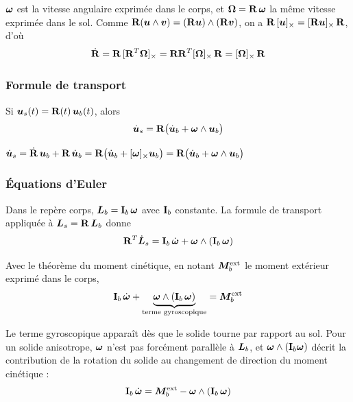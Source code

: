 $\bm{\omega}$ est la vitesse angulaire exprimée dans le corps, et
$\bm{\Omega} = \mathbf{R}\,\bm{\omega}$ la même vitesse exprimée dans
le sol. Comme $\mathbf{R}(\bm{u}\wedge\bm{v})
= (\mathbf{R}\bm{u})\wedge(\mathbf{R}\bm{v})$, on a
$\mathbf{R}\,[\bm{u}]_{\times} = [\mathbf{R}\bm{u}]_{\times}\,\mathbf{R}$, d'où
\[
    \dot{\mathbf{R}} = \mathbf{R}\,[\mathbf{R}^T\bm{\Omega}]_{\times}
    = \mathbf{R}\mathbf{R}^T[\bm{\Omega}]_{\times}\,\mathbf{R}
    = [\bm{\Omega}]_{\times}\,\mathbf{R}
\]

\subsubsection{Formule de transport}

\begin{theoreme}
    Si $\bm{u}_s(t) = \mathbf{R}(t)\,\bm{u}_b(t)$, alors
    \[
        \dot{\bm{u}}_s
        = \mathbf{R}\bigl(\dot{\bm{u}}_b + \bm{\omega}\wedge\bm{u}_b\bigr)
    \]
\end{theoreme}

\begin{preuve}
    $\dot{\bm{u}}_s = \dot{\mathbf{R}}\,\bm{u}_b
    + \mathbf{R}\,\dot{\bm{u}}_b
    = \mathbf{R}\bigl(\dot{\bm{u}}_b
    + [\bm{\omega}]_{\times}\bm{u}_b\bigr)
    = \mathbf{R}\bigl(\dot{\bm{u}}_b + \bm{\omega}\wedge\bm{u}_b\bigr)$
\end{preuve}

\subsubsection{Équations d'Euler}

Dans le repère corps, $\bm{L}_b = \mathbf{I}_b\,\bm{\omega}$ avec
$\mathbf{I}_b$ constante. La formule de transport appliquée à
$\bm{L}_s = \mathbf{R}\,\bm{L}_b$ donne
\[
    \mathbf{R}^T\dot{\bm{L}}_s
    = \mathbf{I}_b\,\dot{\bm{\omega}}
    + \bm{\omega}\wedge(\mathbf{I}_b\,\bm{\omega})
\]

\begin{theoreme}
    Avec le théorème du moment cinétique, en notant
    $\bm{M}_b^{\mathrm{ext}}$ le moment extérieur exprimé dans le
    corps,
    \[
        \mathbf{I}_b\,\dot{\bm{\omega}}
        + \underbrace{\bm{\omega}\wedge(\mathbf{I}_b\,\bm{\omega})}
        _{\text{terme gyroscopique}}
        = \bm{M}_b^{\mathrm{ext}}
    \]
\end{theoreme}

Le terme gyroscopique apparaît dès que le solide tourne par rapport au
sol. Pour un solide anisotrope, $\bm{\omega}$ n'est pas forcément parallèle à
$\bm{L}_b$, et $\bm{\omega}\wedge(\mathbf{I}_b\bm{\omega})$ décrit
la contribution de la rotation du solide au changement de direction du
moment cinétique :
\[
    \mathbf{I}_b\,\dot{\bm{\omega}}
    = \bm{M}_b^{\mathrm{ext}}
    - \bm{\omega}\wedge(\mathbf{I}_b\,\bm{\omega})
\]

